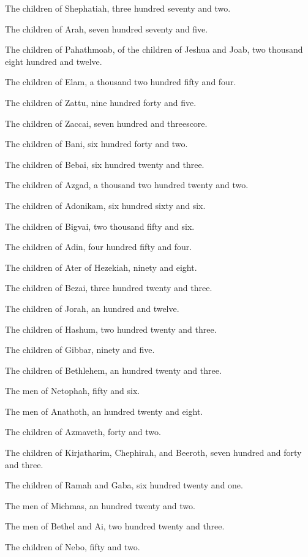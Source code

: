 \verse The children of Shephatiah, three hundred seventy and two.

\verse The children of Arah, seven hundred seventy and five.

\verse The children of Pahathmoab, of the children of Jeshua and Joab, two thousand eight hundred and twelve.

\verse The children of Elam, a thousand two hundred fifty and four.

\verse The children of Zattu, nine hundred forty and five.

\verse The children of Zaccai, seven hundred and threescore.

\verse The children of Bani, six hundred forty and two.

\verse The children of Bebai, six hundred twenty and three.

\verse The children of Azgad, a thousand two hundred twenty and two.

\verse The children of Adonikam, six hundred sixty and six.

\verse The children of Bigvai, two thousand fifty and six.

\verse The children of Adin, four hundred fifty and four.

\verse The children of Ater of Hezekiah, ninety and eight.

\verse The children of Bezai, three hundred twenty and three.

\verse The children of Jorah, an hundred and twelve.

\verse The children of Hashum, two hundred twenty and three.

\verse The children of Gibbar, ninety and five.

\verse The children of Bethlehem, an hundred twenty and three.

\verse The men of Netophah, fifty and six.

\verse The men of Anathoth, an hundred twenty and eight.

\verse The children of Azmaveth, forty and two.

\verse The children of Kirjatharim, Chephirah, and Beeroth, seven hundred and forty and three.

\verse The children of Ramah and Gaba, six hundred twenty and one.

\verse The men of Michmas, an hundred twenty and two.

\verse The men of Bethel and Ai, two hundred twenty and three.

\verse The children of Nebo, fifty and two.


